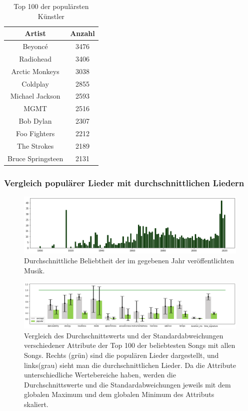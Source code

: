 \documentclass[conference]{IEEEtran}
\begin{document}
\begin{table}[h]
\centering
\begin{tabular}{c c} 
\hline
Artist & Anzahl \\ [0.5ex] 
\hline
Beyoncé & 3476 \\ 
Radiohead & 3406 \\ 
Arctic Monkeys & 3038 \\ 
Coldplay & 2855 \\ 
Michael Jackson & 2593 \\ 
MGMT & 2516 \\ 
Bob Dylan & 2307 \\ 
Foo Fighters & 2212 \\ 
The Strokes & 2189 \\ 
Bruce Springsteen & 2131 \\ [1ex] 
\hline
\end{tabular}
\caption{Top 100 der populärsten Künstler}
\label{tab:topartists}
\end{table}
\subsubsection{Vergleich populärer Lieder mit durchschnittlichen Liedern}

\begin{figure}[t]
\centering
\includegraphics[width=\textwidth]{images/popularity_per_year.png}
\caption{Durchschnittliche Beliebtheit der im gegebenen Jahr veröffentlichten Musik.}
\label{popularity_time}
\end{figure}

\begin{figure}[t]
    \centering
    \includegraphics[width=\textwidth]{images/pop_tracks.png}
    \caption{Vergleich des Durchschnittswerts und der Standardabweichungen verschiedener Attribute der Top 100 der beliebtesten Songs mit allen Songs. Rechts (grün) sind die populären Lieder dargestellt, und links(grau) sieht man die durchschnittlichen Lieder. Da die Attribute unterschiedliche Wertebereiche haben, werden die Durchschnittswerte und die Standardabweichungen jeweils mit dem globalen Maximum und dem globalen Minimum des Attributs skaliert.}
    \label{popular tracks}
\end{figure}
\end{document}
